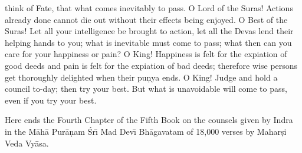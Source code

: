 think of Fate, that what comes inevitably to pass. O Lord of the Suras! Actions already done cannot die out without their effects being enjoyed. O Best of the Suras! Let all your intelligence be brought to action, let all the Devas lend their helping hands to you; what is inevitable must come to pass; what then can you care for your happiness or pain? O King! Happiness is felt for the expiation of good deeds and pain is felt for the expiation of bad deeds; therefore wise persons get thoroughly delighted when their pu\d{n}ya ends. O King! Judge and hold a council to-day; then try your best. But what is unavoidable will come to pass, even if you try your best.

Here ends the Fourth Chapter of the Fifth Book on the counsels given by Indra in the M\=ah\=a Pur\=a\d{n}am \'Sr\={\i} Mad Dev\={\i} Bh\=agavatam of 18,000 verses by Mahar\d{s}i Veda Vy\=asa.



